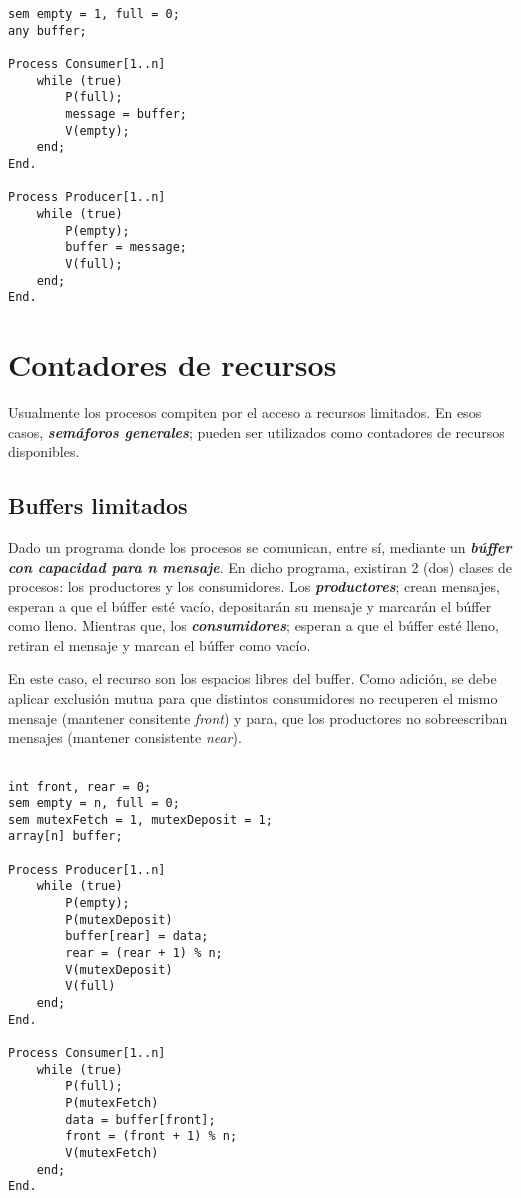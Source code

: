 \documentclass[a4paper, 10pt, margin=0in]{report}
\begin{document}
\begin{lstlisting}[multicols=2]
sem empty = 1, full = 0;
any buffer;

Process Consumer[1..n]
    while (true)
        P(full);
        message = buffer;
        V(empty);
    end;
End.

Process Producer[1..n]
    while (true)
        P(empty);
        buffer = message;
        V(full);
    end;
End.
\end{lstlisting}

\section{Contadores de recursos}

Usualmente los procesos compiten por el acceso a recursos limitados. En esos casos, \textbf{\emph{semáforos generales}}; pueden ser utilizados como contadores de recursos disponibles.

\subsection{Buffers limitados}

Dado un programa donde los procesos se comunican, entre sí, mediante un \textbf{\emph{búffer con capacidad para n mensaje}}. En dicho programa, existiran 2 (dos) clases de procesos: los productores y los consumidores. Los \textbf{\emph{productores}}; crean mensajes, esperan a que el búffer esté vacío, depositarán su mensaje y marcarán el búffer como lleno. Mientras que, los \textbf{\emph{consumidores}}; esperan a que el búffer esté lleno, retiran el mensaje y marcan el búffer como vacío.

En este caso, el recurso son los espacios libres del buffer. Como adición, se debe aplicar exclusión mutua para que distintos consumidores no recuperen el mismo mensaje (mantener consitente \emph{front}) y para, que los productores no sobreescriban mensajes (mantener consistente \emph{near}).

\begin{lstlisting}[multicols=2]

int front, rear = 0;
sem empty = n, full = 0;
sem mutexFetch = 1, mutexDeposit = 1;
array[n] buffer; 

Process Producer[1..n]
    while (true)
        P(empty);
        P(mutexDeposit)
        buffer[rear] = data;
        rear = (rear + 1) % n;
        V(mutexDeposit)
        V(full)
    end;
End.

Process Consumer[1..n]
    while (true)
        P(full);
        P(mutexFetch)
        data = buffer[front];
        front = (front + 1) % n;
        V(mutexFetch)
    end;
End.
\end{lstlisting}
\end{document}
